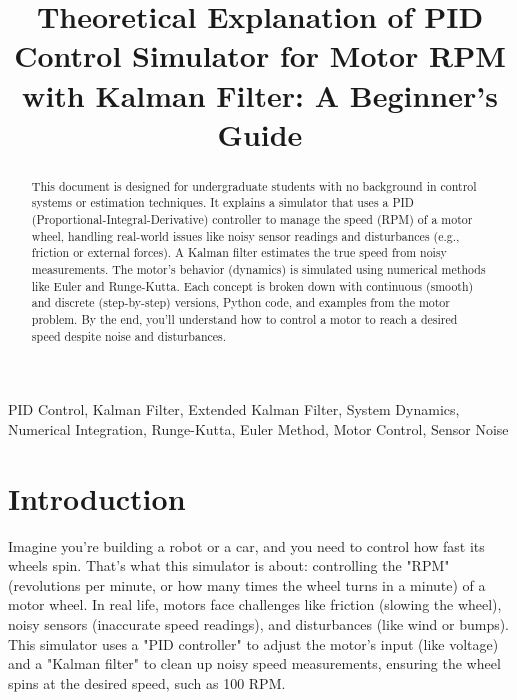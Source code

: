 \documentclass[conference]{IEEEtran}
\begin{document}
	
	\title{Theoretical Explanation of PID Control Simulator for Motor RPM with Kalman Filter: A Beginner's Guide}
	
	\author{}

	
	\maketitle
	
	\begin{abstract}
		This document is designed for undergraduate students with no background in control systems or estimation techniques. It explains a simulator that uses a PID (Proportional-Integral-Derivative) controller to manage the speed (RPM) of a motor wheel, handling real-world issues like noisy sensor readings and disturbances (e.g., friction or external forces). A Kalman filter estimates the true speed from noisy measurements. The motor's behavior (dynamics) is simulated using numerical methods like Euler and Runge-Kutta. Each concept is broken down with continuous (smooth) and discrete (step-by-step) versions, Python code, and examples from the motor problem. By the end, you'll understand how to control a motor to reach a desired speed despite noise and disturbances.
	\end{abstract}
	
	\begin{IEEEkeywords}
		PID Control, Kalman Filter, Extended Kalman Filter, System Dynamics, Numerical Integration, Runge-Kutta, Euler Method, Motor Control, Sensor Noise
	\end{IEEEkeywords}
	
	\section{Introduction}
	Imagine you're building a robot or a car, and you need to control how fast its wheels spin. That's what this simulator is about: controlling the "RPM" (revolutions per minute, or how many times the wheel turns in a minute) of a motor wheel. In real life, motors face challenges like friction (slowing the wheel), noisy sensors (inaccurate speed readings), and disturbances (like wind or bumps). This simulator uses a "PID controller" to adjust the motor's input (like voltage) and a "Kalman filter" to clean up noisy speed measurements, ensuring the wheel spins at the desired speed, such as 100 RPM.
	
\end{document}
